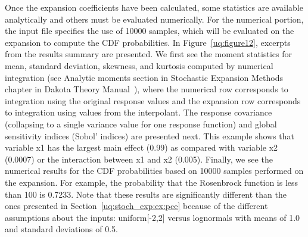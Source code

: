 Once the expansion coefficients have been calculated, some statistics
are available analytically and others must be evaluated numerically.
For the numerical portion, the input file specifies the use of 10000
samples, which will be evaluated on the expansion to compute the CDF
probabilities. In Figure~\ref{uq:figure12}, excerpts from the results
summary are presented. We first see the moment statistics for mean,
standard deviation, skewness, and kurtosis computed by numerical
integration (see Analytic moments section in Stochastic Expansion
Methods chapter in Dakota Theory Manual~\cite{TheoMan}), where the
numerical row corresponds to integration using the original response
values and the expansion row corresponds to integration using values
from the interpolant. The response covariance (collapsing to a single
variance value for one response function) and global sensitivity
indices (Sobol' indices) are presented next. This example shows that
variable x1 has the largest main effect (0.99) as compared with
variable x2 (0.0007) or the interaction between x1 and x2 (0.005).
Finally, we see the numerical results for the CDF probabilities based
on 10000 samples performed on the expansion. For example, the probability 
that the Rosenbrock function is less than 100 is 0.7233. Note that these 
results are significantly different than the ones presented in 
Section~\ref{uq:stoch_exp:ex:pce} because of 
the different assumptions about the inputs: uniform[-2,2] versus
lognormals with means of 1.0 and standard deviations of 0.5. 
